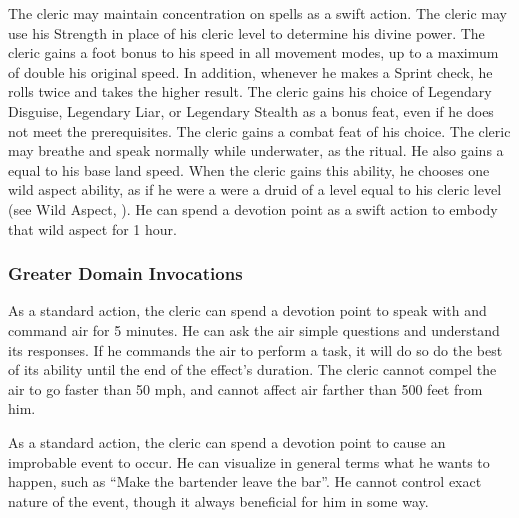             The cleric may maintain concentration on  spells as a swift action.
            The cleric may use his Strength in place of his cleric level to determine his divine power.
            The cleric gains a  foot bonus to his speed in all movement modes, up to a maximum of double his original speed.
            In addition, whenever he makes a Sprint check, he rolls twice and takes the higher result.
            The cleric gains his choice of Legendary Disguise, Legendary Liar, or Legendary Stealth as a bonus feat, even if he does not meet the prerequisites.
            The cleric gains a combat feat of his choice.
             The cleric may breathe and speak normally while underwater, as the 
            ritual.
            He also gains a  equal to his base land speed.
            When the cleric gains this ability, he chooses one wild aspect ability, as if he were a were a druid of a level equal to his cleric level (see Wild Aspect, ).
            He can spend a devotion point as a swift action to embody that wild aspect for 1 hour.

        \subsubsection{Greater Domain Invocations}\label{Greater Domain Invocations}

            As a standard action, the cleric can spend a devotion point to speak with and command air for 5 minutes.
            He can ask the air simple questions and understand its responses.
            If he commands the air to perform a task, it will do so do the best of its ability until the end of the effect's duration.
            The cleric cannot compel the air to go faster than 50 mph, and cannot affect air farther than 500 feet from him.

            As a standard action, the cleric can spend a devotion point to cause an improbable event to occur.
            He can visualize in general terms what he wants to happen, such as ``Make the bartender leave the bar''.
            He cannot control exact nature of the event, though it always beneficial for him in some way.

